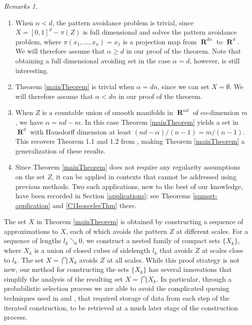 \documentclass[dvipsnames,letterpaper,12pt]{article}
\numberwithin{equation}{section}
\theoremstyle{plain}
\theoremstyle{remark}
\newtheorem*{remarks}{Remarks}
\DeclareMathOperator{\RR}{\mathbf{R}}
\begin{document}
\begin{remarks}
	\
	\begin{enumerate}[1.]
		\item When $\alpha < d$, the pattern avoidance problem is trivial, since $X = [0,1]^d - \pi(Z)$ is full dimensional and solves the pattern avoidance problem, where $\pi(x_1, \dots, x_n) = x_1$ is a projection map from $\RR^{dn}$ to $\RR^d$. We will therefore assume that $\alpha \geq d$ in our proof of the theorem. Note that obtaining a full dimensional avoiding set in the case $\alpha = d$, however, is still interesting.

		\item Theorem \ref{mainTheorem} is trivial when $\alpha = dn$, since we can set $X = \emptyset$. We will therefore assume that $\alpha < dn$ in our proof of the theorem.

		\item When $Z$ is a countable union of smooth manifolds in $\RR^{nd}$ of co-dimension $m$, we have $\alpha = nd - m$. In this case Theorem \ref{mainTheorem} yields a set in $\RR^d$ with Hausdorff dimension at least $(nd - \alpha)/(n-1) = m/(n-1)$. This recovers Theorem 1.1 and 1.2 from \cite{MalabikaRob}, making Theorem \ref{mainTheorem} a generalization of these results.

		\item Since Theorem \ref{mainTheorem} does not require any regularity assumptions on the set $Z$, it can be applied in contexts that cannot be addressed using previous methods. Two such applications, new to the best of our knowledge, have been recorded in Section \ref{applications}; see Theorems \ref{sumset-application} and \ref{C1IsoscelesThm} there.
	\end{enumerate}
\end{remarks}

The set $X$ in Theorem \ref{mainTheorem} is obtained by constructing a sequence of approximations to $X$, each of which avoids the pattern $Z$ at different scales. For a sequence of lengths $l_k \searrow 0$, we construct a nested family of compact sets $\{ X_k \}$, where $X_k$ is a union of closed cubes of sidelength $l_k$ that avoids $Z$ at scales close to $l_k$. The set $X=\bigcap X_k$ avoids $Z$ at all scales. While this proof strategy is not new, our method for constructing the sets $\{ X_k \}$ has several innovations that simplify the analysis of the resulting set $X = \bigcap X_k$. In particular, through a probabilistic selection process we are able to avoid the complicated queuing techniques used in \cite{KeletiDimOneSet} and \cite{MalabikaRob}, that required storage of data from each step of the iterated construction, to be retrieved at a much later stage of the construction process.
\end{document}

